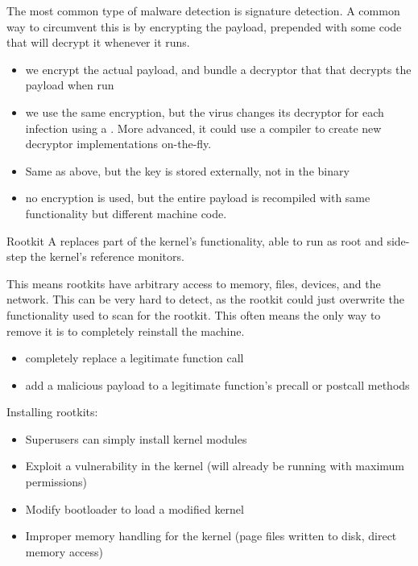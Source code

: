 The most common type of malware detection is signature detection. A common way to circumvent this is by encrypting the payload, prepended with some code that will decrypt it whenever it runs.
\begin{itemize}
    \item {} we encrypt the actual payload, and bundle a decryptor that that decrypts the payload when run
    \item {} we use the same encryption, but the virus changes its decryptor for each infection using a . More advanced, it could use a compiler to create new decryptor implementations on-the-fly.
    \item {} Same as above, but the key is stored externally, not in the binary
    \item {} no encryption is used, but the entire payload is recompiled with same functionality but different machine code.
\end{itemize}

\begin{dfnbox}{Rootkit}{}
    A  replaces part of the kernel's functionality, able to run as root and side-step the kernel's reference monitors.
\end{dfnbox}

This means rootkits have arbitrary access to memory, files, devices, and the network. This can be very hard to detect, as the rootkit could just overwrite the functionality used to scan for the rootkit. This often means the only way to remove it is to completely reinstall the machine.

\begin{itemize}
    \item {} completely replace a legitimate function call
    \item {} add a malicious payload to a legitimate function's precall or postcall methods
\end{itemize}

Installing rootkits:
\begin{itemize}
    \item Superusers can simply install kernel modules
    \item Exploit a vulnerability in the kernel (will already be running with maximum permissions)
    \item Modify bootloader to load a modified kernel
    \item Improper memory handling for the kernel  (page files written to disk, direct memory access)
\end{itemize}

